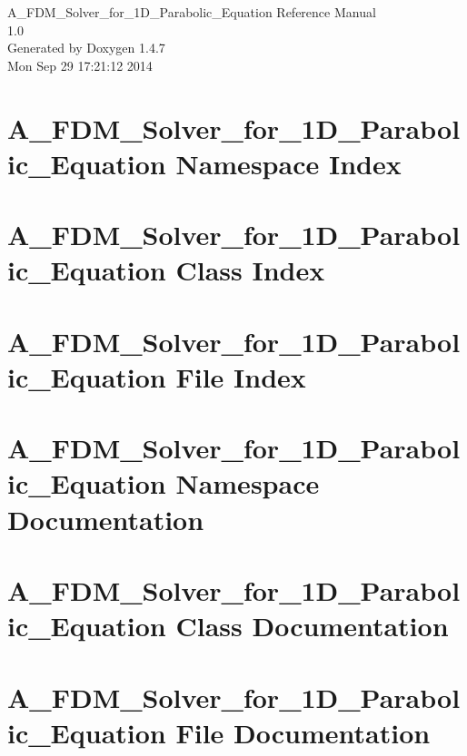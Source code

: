 \documentclass[a4paper]{book}
\begin{document}
\begin{titlepage}
\vspace*{7cm}
\begin{center}
{\Large A\_\-FDM\_\-Solver\_\-for\_\-1D\_\-Parabolic\_\-Equation Reference Manual\\[1ex]\large 1.0 }\\
\vspace*{1cm}
{\large Generated by Doxygen 1.4.7}\\
\vspace*{0.5cm}
{\small Mon Sep 29 17:21:12 2014}\\
\end{center}
\end{titlepage}
\clearemptydoublepage
{}
\tableofcontents
\clearemptydoublepage
{}
\chapter{A\_\-FDM\_\-Solver\_\-for\_\-1D\_\-Parabolic\_\-Equation Namespace Index}

\chapter{A\_\-FDM\_\-Solver\_\-for\_\-1D\_\-Parabolic\_\-Equation Class Index}

\chapter{A\_\-FDM\_\-Solver\_\-for\_\-1D\_\-Parabolic\_\-Equation File Index}

\chapter{A\_\-FDM\_\-Solver\_\-for\_\-1D\_\-Parabolic\_\-Equation Namespace Documentation}


\chapter{A\_\-FDM\_\-Solver\_\-for\_\-1D\_\-Parabolic\_\-Equation Class Documentation}



\chapter{A\_\-FDM\_\-Solver\_\-for\_\-1D\_\-Parabolic\_\-Equation File Documentation}







\printindex
\end{document}
